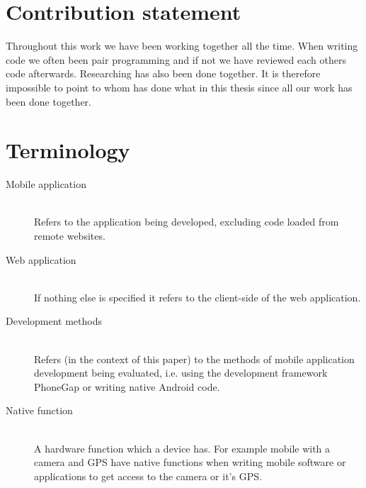 \section{Contribution statement}
Throughout this work we have been working together all the time. When writing code we often been pair programming and if not we have reviewed each others code afterwards. Researching has also been done together. It is therefore impossible to point to whom has done what in this thesis since all our work has been done together. 


\section{Terminology}
\begin{description}
  \item[Mobile application] \hfill \\
    Refers to the application being developed, excluding code loaded from remote        websites.
  \item[Web application] \hfill \\
    If nothing else is specified it refers to the client-side of the web application.
  \item[Development methods] \hfill \\
    Refers (in the context of this paper) to the methods of mobile application          development being evaluated, i.e. using the development framework PhoneGap or       writing native Android code.
  \item[Native function] \hfill \\
     A hardware function which a device has. For example mobile with a camera and GPS have native functions when writing mobile software or applications to get access to the camera or it's GPS.
\end{description}
